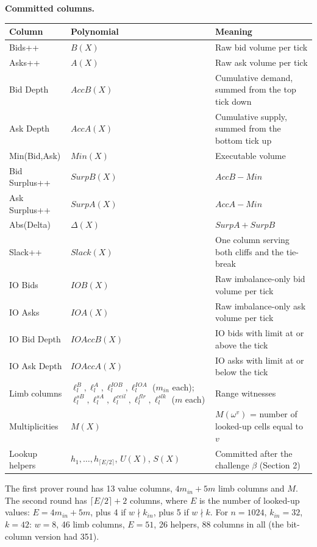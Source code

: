 \textbf{Committed columns.}

\begin{longtable}[]{@{}lll@{}}
\toprule\noalign{}
Column & Polynomial & Meaning \\
\midrule\noalign{}
\endhead
\bottomrule\noalign{}
\endlastfoot
Bids++ & \(B(X)\) & Raw bid volume per tick \\
Asks++ & \(A(X)\) & Raw ask volume per tick \\
Bid Depth & \(AccB(X)\) & Cumulative demand, summed from the top tick down \\
Ask Depth & \(AccA(X)\) & Cumulative supply, summed from the bottom tick up \\
Min(Bid,Ask) & \(Min(X)\) & Executable volume \\
Bid Surplus++ & \(SurpB(X)\) & \(AccB - Min\) \\
Ask Surplus++ & \(SurpA(X)\) & \(AccA - Min\) \\
Abs(Delta) & \(\Delta(X)\) & \(SurpA + SurpB\) \\
Slack++ & \(Slack(X)\) & One column serving both cliffs and the tie-break \\
IO Bids & \(IOB(X)\) & Raw imbalance-only bid volume per tick \\
IO Asks & \(IOA(X)\) & Raw imbalance-only ask volume per tick \\
IO Bid Depth & \(IOAccB(X)\) & IO bids with limit at or above the tick \\
IO Ask Depth & \(IOAccA(X)\) & IO asks with limit at or below the tick \\
Limb columns & \(\ell^{B}_l, \ell^{A}_l, \ell^{IOB}_l, \ell^{IOA}_l\) (\(m_{in}\) each); \(\ell^{sB}_l, \ell^{sA}_l, \ell^{ceil}_l, \ell^{flr}_l, \ell^{slk}_l\) (\(m\) each) & Range witnesses \\
Multiplicities & \(M(X)\) & \(M(\omega^v)\) = number of looked-up cells equal to \(v\) \\
Lookup helpers & \(h_1, \ldots, h_{\lceil E/2 \rceil}\), \(U(X)\), \(S(X)\) & Committed after the challenge \(\beta\) (Section 2) \\
\end{longtable}

The first prover round has 13 value columns, \(4m_{in} + 5m\) limb columns and \(M\). The second round has \(\lceil E/2 \rceil + 2\) columns, where \(E\) is the number of looked-up values: \(E = 4m_{in} + 5m\), plus 4 if \(w \nmid k_{in}\), plus 5 if \(w \nmid k\). For \(n = 1024\), \(k_{in} = 32\), \(k = 42\): \(w = 8\), 46 limb columns, \(E = 51\), 26 helpers, 88 columns in all (the bit-column version had 351).

